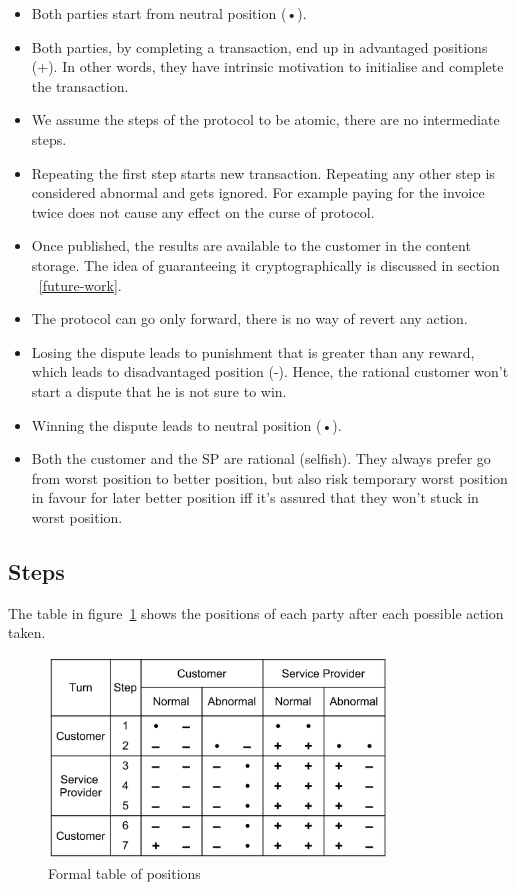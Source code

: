 \documentclass{ieeeaccess}
\begin{document}
\begin{itemize}

\item
  Both parties start from neutral position (•).
\item
  Both parties, by completing a transaction, end up in advantaged positions (+). In other words, they have intrinsic motivation to initialise and complete the transaction.
\item
  We assume the steps of the protocol to be atomic, there are no
  intermediate steps.
\item
  Repeating the first step starts new transaction. Repeating any other
  step is considered abnormal and gets ignored. For example paying for
  the invoice twice does not cause any effect on the curse of protocol.
\item
  Once published, the results are available to the customer in the
  content storage. The idea of guaranteeing it cryptographically is
  discussed in section ~\ref{future-work}.
\item
  The protocol can go only forward, there is no way of revert any
  action.
\item
  Losing the dispute leads to punishment that is greater than any
  reward, which leads to disadvantaged position (-). Hence, the rational
  customer won't start a dispute that he is not sure to win.
\item
  Winning the dispute leads to neutral position (•).
\item
  Both the customer and the SP are rational (selfish). They always
  prefer go from worst position to better position, but also risk
  temporary worst position in favour for later better position iff it's
  assured that they won't stuck in worst position.
\end{itemize}

\subsection{Steps}\label{steps}

The table in figure~\ref{fig:positions} shows the positions of each party after each possible
action taken.

\begin{figure}[h!]
\includegraphics[width=9cm]{formal-table-of-positions.png}
\centering
\caption{Formal table of positions}
\label{fig:positions}
\end{figure}
\end{document}
